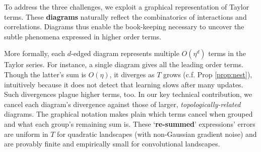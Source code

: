   To address the three challenges, we exploit a graphical representation of
Taylor terms.  These \textbf{diagrams} naturally reflect the combinatorics of
interactions and correlations.
Diagrams thus enable the book-keeping necessary to uncover the subtle
phenomena expressed in higher order terms. 

  More formally, each $d$-edged diagram represents multiple $O(\eta^d)$ terms
in the Taylor series.  For instance, a single diagram gives all the leading
order terms.  Though the latter's sum is $O(\eta)$, it diverges as $T$ grows
(c.f. Prop \ref{prop:nest}), intuitively because it does not detect that
learning slows after many updates.  Such divergences plague higher terms, too.
%
In our key technical contribution, we cancel each diagram's divergence against
those of larger, \emph{topologically-related} diagrams.  The graphical notation makes
plain which terms cancel when grouped and what each group's remaining sum is. 
%
These `\textbf{re-summed}' expressions' errors are uniform in $T$ for quadratic
landscapes (with non-Gaussian gradient noise) and are provably finite and
empirically small for convolutional landscapes.


